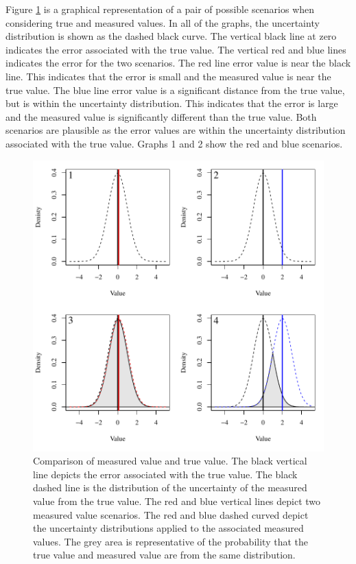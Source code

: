 \begin{linenumbers}
Figure \ref{fig:TV-MVError} is a graphical representation of a pair of possible scenarios when considering true and measured values.  In all of the graphs, the uncertainty distribution is shown as the dashed black curve.  The vertical black line at zero indicates the error associated with the true value.  The vertical red and blue lines indicates the error for the two scenarios.  The red line error value is near the black line.  This indicates that the error is small and the measured value is near the true value.  The blue line error value is a significant distance from the true value, but is within the uncertainty distribution.  This indicates that the error is large and the measured value is significantly different than the true value.  Both scenarios are plausible as the error values are within the uncertainty distribution associated with the true value.  Graphs 1 and 2 show the red and blue scenarios.
\begin{figure}[htbp]
\begin{center}
	\includegraphics[width=6in]{"Figures/TV-MV Error"}
	\caption[Comparison of measured value and true value]{Comparison of measured value and true value.  The black vertical line depicts the error associated with the true value.  The black dashed line is the distribution of the uncertainty of the measured value from the true value.  The red and blue vertical lines depict two measured value scenarios.  The red and blue dashed curved depict the uncertainty distributions applied to the associated measured values.  The grey area is representative of the probability that the true value and measured value are from the same distribution.}
	\label{fig:TV-MVError}
\end{center}
\end{figure}


\end{linenumbers}
